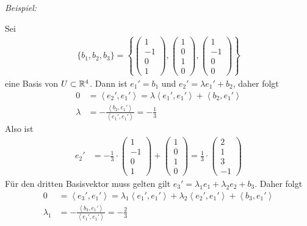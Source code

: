 \textit{Beispiel:}

Sei
\begin{align*}
    \{ b_1,b_2,b_3 \} =
    \left\{ \begin{pmatrix}
        1\\-1\\0\\1
    \end{pmatrix}
    ,
    \begin{pmatrix}
        1\\0\\1\\0
    \end{pmatrix}
    ,
    \begin{pmatrix}
        1\\-1\\0\\0
    \end{pmatrix}
    \right\}
\end{align*}
eine Basis von $U \subset \mathbb{R}^4$.
Dann ist $e_1' = b_1$ und $e_2' = \lambda e_1' + b_2$, daher folgt
\begin{align*}
    0 & = \left\langle e_2', e_1' \right\rangle = \lambda \left\langle e_1', e_1' \right\rangle + \left\langle b_2, e_1' \right\rangle \\
    \lambda & = - \frac{ \left\langle b_2, e_1' \right\rangle}{ \left\langle e_1', e_1' \right\rangle} = - \frac{1}{3}
\end{align*}
Also ist
\begin{align*}
    e_2' & = - \frac{1}{3} \cdot
    \begin{pmatrix}
        1\\-1\\0\\1
    \end{pmatrix}
    +
    \begin{pmatrix}
        1\\0\\1\\0
    \end{pmatrix}
    = \frac{1}{3} \cdot
    \begin{pmatrix}
        2\\1\\3\\-1
    \end{pmatrix}
\end{align*}
Für den dritten Basisvektor muss gelten gilt $e_3' = \lambda_1 e_1 + \lambda_2 e_2 + b_3$.
Daher folgt
\begin{align*}
    0 & = \left\langle e_3', e_1' \right\rangle = \lambda_1 \left\langle e_1', e_1' \right\rangle + \lambda_2 \left\langle e_2', e_1' \right\rangle + \left\langle b_3, e_1' \right\rangle\\
    \lambda_1 & = - \frac{ \left\langle b_3, e_1'\right\rangle }{ \left\langle e_1', e_1' \right\rangle } = - \frac{2}{3}
\end{align*}
